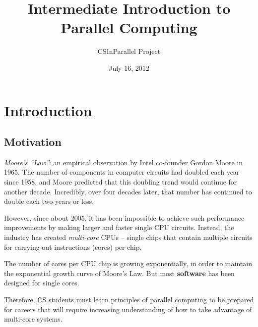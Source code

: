 \documentclass[letterpaper,10pt,english]{sphinxmanual}
\title{Intermediate Introduction to Parallel Computing}
\date{July 16, 2012}
\author{CSInParallel Project}
\begin{document}
\maketitle
\tableofcontents
{}\label{index::doc}



\chapter{Introduction}
\label{Introduction/Introduction:introduction}\label{Introduction/Introduction::doc}\label{Introduction/Introduction:intermediate-introduction-to-parallel-computing}

\section{Motivation}
\label{Introduction/Introduction:motivation}
\emph{Moore's ``Law''}: an empirical observation by Intel co-founder Gordon Moore in 1965. The number of components in computer circuits had doubled each year since 1958, and Moore predicted that this doubling trend would continue for another decade.  Incredibly, over four decades later, that number has continued to double each two years or less.

However, since about 2005, it has been impossible to achieve such performance improvements by making larger and faster single CPU circuits. Instead, the industry has created \emph{multi-core} CPUs – single chips that contain multiple circuits for carrying out instructions (cores) per chip.

The number of cores per CPU chip is growing exponentially, in order to maintain the exponential growth curve of Moore's Law. But most \textbf{software} has been designed for single cores.

Therefore, CS students must learn principles of parallel computing to be prepared for careers that will require increasing understanding of how to take advantage of multi-core systems.
\end{document}
